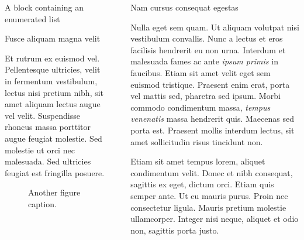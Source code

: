 \documentclass[final]{beamer}
\newlength{\sepwidth}
\newlength{\colwidth}
\newcommand{\separatorcolumn}{\begin{column}{\sepwidth}\end{column}}
\begin{document}
\begin{frame}[t]
\begin{columns}[t]
\begin{column}{\colwidth}
\begin{block}{A block containing an enumerated list}
			\end{block}

			\begin{block}{Fusce aliquam magna velit}

				Et rutrum ex euismod vel. Pellentesque ultricies, velit in fermentum
				vestibulum, lectus nisi pretium nibh, sit amet aliquam lectus augue vel
				velit. Suspendisse rhoncus massa porttitor augue feugiat molestie. Sed
				molestie ut orci nec malesuada. Sed ultricies feugiat est fringilla
				posuere.

				\begin{figure}
					\centering
					\caption{Another figure caption.}
				\end{figure}

			\end{block}

		\end{column}

		\separatorcolumn

		\begin{column}{\colwidth}

			\begin{block}{Nam cursus consequat egestas}

				Nulla eget sem quam. Ut aliquam volutpat nisi vestibulum convallis. Nunc a
				lectus et eros facilisis hendrerit eu non urna. Interdum et malesuada fames
				ac ante \textit{ipsum primis} in faucibus. Etiam sit amet velit eget sem
				euismod tristique. Praesent enim erat, porta vel mattis sed, pharetra sed
				ipsum. Morbi commodo condimentum massa, \textit{tempus venenatis} massa
				hendrerit quis. Maecenas sed porta est. Praesent mollis interdum lectus,
				sit amet sollicitudin risus tincidunt non.

				Etiam sit amet tempus lorem, aliquet condimentum velit. Donec et nibh
				consequat, sagittis ex eget, dictum orci. Etiam quis semper ante. Ut eu
				mauris purus. Proin nec consectetur ligula. Mauris pretium molestie
				ullamcorper. Integer nisi neque, aliquet et odio non, sagittis porta justo.


\end{block}
\end{column}
\end{columns}
\end{frame}
\end{document}
